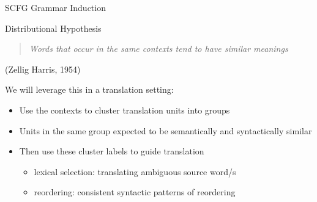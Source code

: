 \documentclass{beamer}
\begin{document}
\begin{frame}[t]{SCFG Grammar Induction}
\begin{exampleblock}{Distributional Hypothesis}
\begin{quote}
\emph{Words that occur in the same contexts tend to have similar meanings}
\end{quote}
\hfill (Zellig Harris, 1954)
\end{exampleblock}

\vspace{3ex}

We will leverage this in a translation setting:
\begin{itemize}
    \item Use the contexts to \alert{cluster} translation units into groups
    \item Units in the same group expected to be semantically and syntactically similar
    \item Then use these cluster labels to guide translation
    \begin{itemize}
        \item lexical selection: translating ambiguous source word/s
        \item reordering: consistent syntactic patterns of reordering
    \end{itemize}
\end{itemize}
\end{frame}
\end{document}
